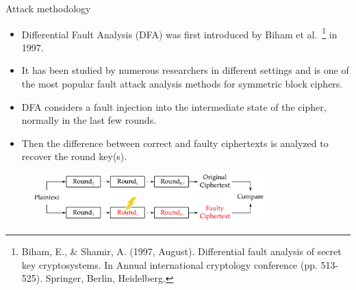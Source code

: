 \begin{frame}{Attack methodology}
    \begin{itemize}
        \item Differential Fault Analysis (DFA) was first introduced by Biham et al.~\footnote{Biham, E., \& Shamir, A. (1997, August). Differential fault analysis of secret key cryptosystems. In Annual international cryptology conference (pp. 513-525). Springer, Berlin, Heidelberg.} in 1997.
       \item It has been studied by numerous researchers in different settings and is one of the most popular fault attack analysis methods for symmetric block ciphers.
       \item DFA considers a fault injection into the intermediate state of the cipher, normally in the last few rounds.
       \item Then the difference between correct and faulty ciphertexts is analyzed to recover the round key(s).
    \end{itemize}
\begin{figure}
    \centering
    \includegraphics[width=0.8\textwidth]{fig/dfa}
\end{figure}
\end{frame}


